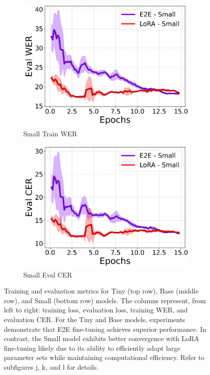 \documentclass[10pt,twocolumn,letterpaper]{article}
\begin{document}
\begin{figure}[t]
\begin{subfigure}[b]{0.24\textwidth}
        \includegraphics[width=\textwidth]{./small/eval_wer_line.png}
        \caption{Small Train WER}
    \end{subfigure}
    \begin{subfigure}[b]{0.24\textwidth}
        \centering
        \includegraphics[width=\textwidth]{./small/eval_cer_line.png}
        \caption{Small Eval CER}
    \end{subfigure}
    \caption{Training and evaluation metrics for Tiny (top row), Base (middle row), and Small (bottom row) models. The columns represent, from left to right: training loss, evaluation loss, training WER, and evaluation CER. For the Tiny and Base models, experiments demonstrate that E2E fine-tuning achieves superior performance. In contrast, the Small model exhibits better convergence with LoRA fine-tuning likely due to its ability to efficiently adapt large parameter sets while maintaining computational efficiency. Refer to subfigures j, k, and l for details.}
    \label{fig:training_metrics}
\end{figure}
\end{document}
